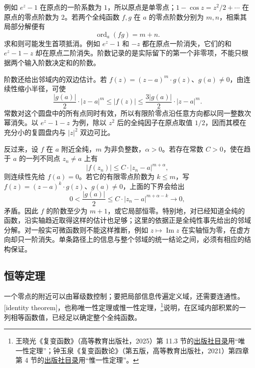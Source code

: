例如 \(e^z-1\) 在原点的一阶系数为 \(1\)，所以原点是单零点；\(1-\cos z=z^2/2+\cdots\) 在原点的零点阶数为 \(2\)。若两个全纯函数 \(f,g\) 在 \(a\) 的零点阶数分别为 \(m,n\)，相乘其局部分解便有
\[
\operatorname{ord}_a(fg)=m+n.
\]
求和则可能发生首项抵消。例如 \(e^z-1\) 和 \(-z\) 都在原点一阶消失，它们的和 \(e^z-1-z\) 却在原点二阶消失。阶数记录的是实际留下的第一个非零项，不能只根据两个输入阶数决定和的阶数。

\ProseParagraphBreak

阶数还给出邻域内的双边估计。若 \(f(z)=(z-a)^m\cdot g(z)\)、\(g(a)\ne0\)，由连续性缩小半径，可使
\[
 \frac{|g(a)|}{2}\cdot|z-a|^m\le |f(z)|
 \le\frac{3|g(a)|}{2}\cdot|z-a|^m.
\]
常数对这个圆盘中的所有点同时有效，所以有限阶零点沿任意方向都以同一整数次幂消失。以 \(e^z-1-z\) 为例，除以 \(z^2\) 后的全纯因子在原点取值 \(1/2\)，因而其模在充分小的复圆盘内与 \(|z|^2\) 双边可比。

\ProseParagraphBreak

反过来，设 \(f\) 在 \(a\) 附近全纯，\(m\) 为非负整数，\(\alpha>0\)。若存在常数 \(C>0\)，使在趋于 \(a\) 的一列不同点 \(z_n\ne a\) 上有
\[
 |f(z_n)|\le C\cdot|z_n-a|^{m+\alpha},
\]
则连续性先给 \(f(a)=0\)。若它的有限零点阶数为 \(k\le m\)，写 \(f(z)=(z-a)^k\cdot g(z)\)、\(g(a)\ne0\)，上面的下界会给出
\[
 0<\frac{|g(a)|}{2}
 \le C\cdot|z_n-a|^{m+\alpha-k}\longrightarrow0,
\]
矛盾。因此 \(f\) 的阶数至少为 \(m+1\)，或它局部恒零。特别地，对已经知道全纯的函数，沿实轴趋近取得这样的估计也足够；这里的依据正是全纯性事先给出的邻域分解。对一般实可微函数则不能这样推断，例如 \(z\mapsto\operatorname{Im}z\) 在实轴恒为零，在虚方向却只一阶消失。单条路径上的信息与整个邻域的统一结论之间，必须有相应的结构保证。

\subsection{恒等定理}
\label{b3:subsec:010402}

一个零点的附近可以由幂级数控制；要把局部信息传遍定义域，还需要连通性。[identity theorem]，也称唯一性定理或惟一性定理，\footnote{王晓光《复变函数》（高等教育出版社，2025）第 11.3 节的\href{https://xuanshu.hep.com.cn/front/h5Mobile/bookDetails?bookId=68598849e119ac9729fe438b}{出版社目录}用“唯一性定理”；钟玉泉《复变函数论》（第五版，高等教育出版社，2021）第四章第 4 节的\href{https://xuanshu.hep.com.cn/front/book/findBookDetails?bookId=60202746966feeeca73340f0}{出版社目录}用“惟一性定理”。}说明，在区域内部积累的一列相等函数值，已经足以确定整个全纯函数。

